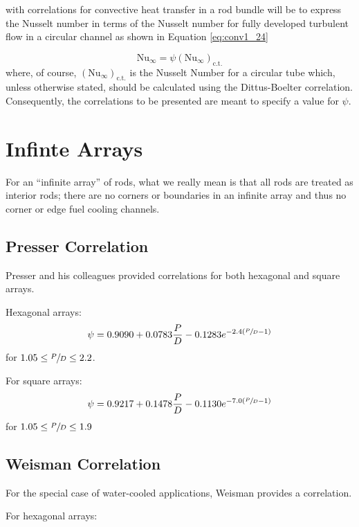  with correlations for convective heat transfer in a rod bundle will be to express the Nusselt number in terms of the Nusselt number for fully developed turbulent flow in a circular channel as shown in Equation \ref{eq:conv1_24}

\begin{equation}
\text{Nu}_{\infty} = \psi \left(\text{Nu}_{\infty} \right)_{\text{c.t.}}
\label{eq:conv1_24}
\end{equation}
where, of course, $(\text{Nu}_{\infty})_{\text{c.t.}}$ is the Nusselt Number for a circular tube which, unless otherwise stated, should be calculated using the Dittus-Boelter correlation.  Consequently, the correlations to be presented are meant to specify a value for $\psi$.

\section{Infinte Arrays}
For an ``infinite array'' of rods, what we really mean is that all rods are treated as interior rods; there are no corners or boundaries in an infinite array and thus no corner or edge fuel cooling channels.

\subsection{Presser Correlation}
Presser and his colleagues provided correlations for both hexagonal and square arrays.

Hexagonal arrays:
\begin{equation}
\psi = 0.9090 + 0.0783 \frac{P}{D} - 0.1283 e^{-2.4(\sfrac{P}{D}-1)}
\label{eq:presser-hex}
\end{equation}
for $1.05 \le \sfrac{P}{D} \le 2.2$.

For square arrays:
\begin{equation}
\psi = 0.9217 + 0.1478 \frac{P}{D} - 0.1130 e^{-7.0(\sfrac{P}{D} - 1)}
\label{eq:presser-square}
\end{equation} 
for $1.05 \le \sfrac{P}{D} \le 1.9$

\subsection{Weisman Correlation} 
For the special case of water-cooled applications, Weisman provides a correlation.\cite{weisman1959heat}

For hexagonal arrays:

